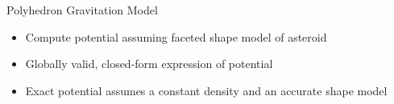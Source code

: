 \documentclass[11pt,professionalfonts]{beamer}
\begin{document}
\begin{frame}{Polyhedron Gravitation Model}

\begin{itemize}
    \item Compute potential assuming faceted shape model of asteroid
    \item Globally valid, closed-form expression of potential
    \item Exact potential assumes a constant density and an accurate shape model
\end{itemize}

\end{frame}
\end{document}
